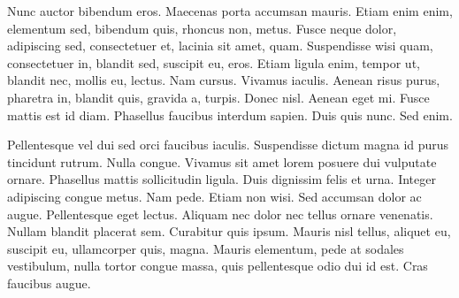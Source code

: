 Nunc auctor bibendum eros. Maecenas porta accumsan mauris. Etiam enim enim,
elementum sed, bibendum quis, rhoncus non, metus. Fusce neque dolor, adipiscing
sed, consectetuer et, lacinia sit amet, quam. Suspendisse wisi quam,
consectetuer in, blandit sed, suscipit eu, eros. Etiam ligula enim, tempor ut,
blandit nec, mollis eu, lectus. Nam cursus. Vivamus iaculis. Aenean risus
purus, pharetra in, blandit quis, gravida a, turpis. Donec nisl. Aenean eget
mi. Fusce mattis est id diam. Phasellus faucibus interdum sapien. Duis quis
nunc. Sed enim.

Pellentesque vel dui sed orci faucibus iaculis. Suspendisse dictum magna id
purus tincidunt rutrum. Nulla congue. Vivamus sit amet lorem posuere dui
vulputate ornare. Phasellus mattis sollicitudin ligula. Duis dignissim felis et
urna. Integer adipiscing congue metus. Nam pede. Etiam non wisi. Sed accumsan
dolor ac augue. Pellentesque eget lectus. Aliquam nec dolor nec tellus ornare
venenatis. Nullam blandit placerat sem. Curabitur quis ipsum. Mauris nisl
tellus, aliquet eu, suscipit eu, ullamcorper quis, magna. Mauris elementum,
pede at sodales vestibulum, nulla tortor congue massa, quis pellentesque odio
dui id est. Cras faucibus augue.


